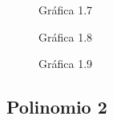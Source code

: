\documentclass{article}
\begin{document}
\begin{figure}[htpb]
	\centering
	
	\caption{Gráfica 1.7}
\end{figure}

\begin{figure}[htpb]
	\centering
	
	\caption{Gráfica 1.8}
\end{figure}

\begin{figure}[htpb]
	\centering
	
	\caption{Gráfica 1.9}
\end{figure}
\newpage
\subsection{Polinomio 2}
\end{document}
